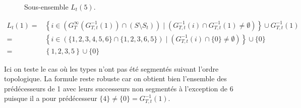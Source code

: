 \begin{figure}[!ht]
{		  
	      }\caption{Sous-ensemble $L_t(5)$.}
         \label{fig:cas_5}
	\end{figure}


	\begin{equation}
	\begin{split}
	 L_t(1) = & \left\{ i \in \left( G_T^{\infty}(G_{T,t}^{-1}(1))  \cap ( S \setminus S_t ) \right) \;|\; \left( G_{T,t}^{-1} (i) \cap G_{T,t}^{-1} (1) 	\neq \emptyset \right) \right\} \cup  G_{T,t}^{-1}(1)	\\
		= & \left\{ i \in \left( 	\{1,2,3,4,5,6\} 	\cap 	\{1,2,3,6,5\}	 \right) \;|\; \left( G_{T,t}^{-1} (i) \cap 	\{0\} 		\neq \emptyset \right) \right\} \cup  	\{0\}		\\
		= & \left\{ 1,2,3,5 \right\}																			\cup  	\{0\}
	\end{split}
	\end{equation}

	Ici on teste le cas où les types n'ont pas été segmentés suivant l'ordre topologique. La formule reste robuste car on obtient bien l'ensemble des prédécesseurs de 1 avec leurs successeurs non segmentés à l'exception de 6 puisque il a pour prédécesseur $\{4\} \neq \{0\} = G_{T,t}^{-1}(1)$.

